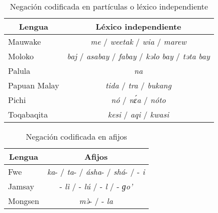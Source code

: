 \begin{table}[htbp]
\centering
\begin{tabular}{lc}
\multicolumn{1}{c}{\textbf{Lengua}} & \textbf{Léxico independiente} \\
\hline
Mauwake & {\setmainfont{Charis SIL} \textit{me}} / {\setmainfont{Charis SIL} \textit{weetak}} / {\setmainfont{Charis SIL} \textit{wia}} / {\setmainfont{Charis SIL} \textit{marew}} \\
Moloko & {\setmainfont{Charis SIL} \textit{baj}} / {\setmainfont{Charis SIL} \textit{asabay}} / {\setmainfont{Charis SIL} \textit{fabay}} / {\setmainfont{Charis SIL} \textit{kəlo}} {\setmainfont{Charis SIL} \textit{bay}} / {\setmainfont{Charis SIL} \textit{təta}} {\setmainfont{Charis SIL} \textit{bay}} \\
Palula & {\setmainfont{Charis SIL} \textit{na}} \\
Papuan Malay & {\setmainfont{Charis SIL} \textit{tida}} / {\setmainfont{Charis SIL} \textit{tra}} / {\setmainfont{Charis SIL} \textit{bukang}} \\
Pichi & {\setmainfont{Charis SIL} \textit{nó}} / {\setmainfont{Charis SIL} \textit{nɛ́a}} / {\setmainfont{Charis SIL} \textit{nóto}} \\
Toqabaqita & {\setmainfont{Charis SIL} \textit{kesi}} / {\setmainfont{Charis SIL} \textit{aqi}} / {\setmainfont{Charis SIL} \textit{kwasi}} \\
\hline
\end{tabular}
\caption{Negación codificada en partículas o léxico independiente}
\label{cuadro14}
\end{table}

\begin{table}[htbp]
\centering
\begin{tabular}{lc}
\multicolumn{1}{c}{\textbf{Lengua}} & \textbf{Afijos} \\
\hline
Fwe   & {\setmainfont{Charis SIL} \textit{ka}}- / {\setmainfont{Charis SIL} \textit{ta}}- / {\setmainfont{Charis SIL} \textit{ásha}}- / {\setmainfont{Charis SIL} \textit{shá}}- / -{\setmainfont{Charis SIL} \textit{i}} \\
Jamsay & -{\setmainfont{Charis SIL} \textit{lì}} / -{\setmainfont{Charis SIL} \textit{lú}} / -{\setmainfont{Charis SIL} \textit{l}} / -{\setmainfont{Charis SIL} \textit{ɡo’}}  \\
Mongsen & {\setmainfont{Charis SIL} \textit{mə̀}}- / -{\setmainfont{Charis SIL} \textit{la}} \\
\hline
\end{tabular}
\caption{Negación codificada en afijos}
\label{cuadro15}
\end{table}

